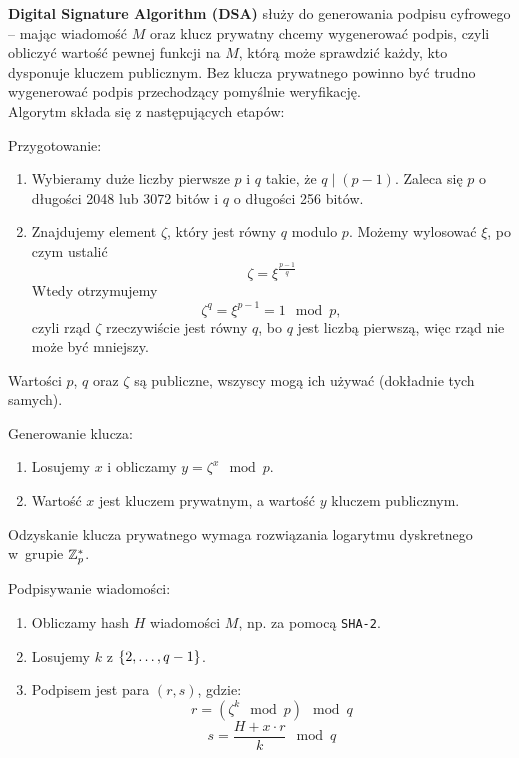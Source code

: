 \textbf{Digital Signature Algorithm (DSA)} służy do generowania podpisu cyfrowego -- mając wiadomość \( M \) oraz klucz prywatny chcemy wygenerować podpis, czyli obliczyć wartość pewnej funkcji na \( M \), którą może sprawdzić każdy, kto dysponuje kluczem publicznym.
Bez klucza prywatnego powinno być trudno wygenerować podpis przechodzący pomyślnie weryfikację. \\

\noindent
Algorytm składa się z następujących etapów:
\begin{greyframe}
    Przygotowanie:
    \begin{enumerate}
        \item Wybieramy duże liczby pierwsze \( p \) i \( q \) takie, że \( q \mid (p-1) \). Zaleca się \( p \) o długości 2048 lub 3072 bitów i \( q \) o długości 256 bitów.
        \item Znajdujemy element \( \zeta \), który jest równy \( q \) modulo \( p \). Możemy wylosować \( \xi \), po czym ustalić
        \[
            \zeta = \xi^{\frac{p-1}{q}}
        \]
        Wtedy otrzymujemy
        \[
            \zeta^q = \xi^{p-1} = 1 \mod p,
        \]
        czyli rząd \( \zeta \) rzeczywiście jest równy \( q \), bo \( q \) jest liczbą pierwszą, więc rząd nie może być mniejszy.
    \end{enumerate}
\end{greyframe}
Wartości \( p \), \( q \) oraz \( \zeta \) są publiczne, wszyscy mogą ich używać (dokładnie tych samych).

\begin{greyframe}
    Generowanie klucza:
    \begin{enumerate}
        \item Losujemy \( x \) i obliczamy \( y = \zeta^x \mod p \).
        \item Wartość \( x \) jest kluczem prywatnym, a wartość \( y \) kluczem publicznym.
    \end{enumerate}
\end{greyframe}
Odzyskanie klucza prywatnego wymaga rozwiązania logarytmu dyskretnego w~grupie \( \mathbb{Z}^{*}_p \).

\begin{greyframe}
    Podpisywanie wiadomości:
    \begin{enumerate}
        \item Obliczamy hash \( H \) wiadomości \( M \), np. za pomocą \texttt{SHA-2}.
        \item Losujemy \( k \) z \( \set{2, \ldots, q-1} \).
        \item Podpisem jest para \( (r, s) \), gdzie:
        \[
            r = (\zeta^k \mod p) \mod q
        \]
        \[
            s = \frac{H + x \cdot r}{k} \mod q
        \]
    \end{enumerate}
\end{greyframe}

